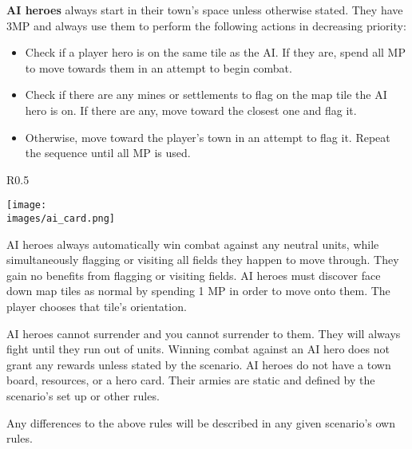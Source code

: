 \clearpage
\textbf{AI heroes} always start in their town's space unless otherwise stated.
They have 3MP and always use them to perform the following actions in decreasing priority:
\begin{itemize}
  \item Check if a player hero is on the same tile as the AI.
    If they are, spend all MP to move towards them in an attempt to begin combat.
  \item Check if there are any mines or settlements to flag on the map tile the AI hero is on.
    If there are any, move toward the closest one and flag it.
  \item Otherwise, move toward the player's town in an attempt to flag it.
Repeat the sequence until all MP is used.
\end{itemize}
\begin{wrapfigure}{R}{0.5\textwidth}
  \begin{center}
  \texttt{[image: \\images/ai\_card.png]}
  \end{center}
\end{wrapfigure}
AI heroes always automatically win combat against any neutral units, while simultaneously flagging or visiting all fields they happen to move through.
They gain no benefits from flagging or visiting fields.
AI heroes must discover face down map tiles as normal by spending 1 MP in order to move onto them.
The player chooses that tile’s orientation.\par
AI heroes cannot surrender and you cannot surrender to them.
They will always fight until they run out of units.
Winning combat against an AI hero does not grant any rewards unless stated by the scenario.
AI heroes do not have a town board, resources, or a hero card.
Their armies are static and defined by the scenario’s set up or other rules.\par
Any differences to the above rules will be described in any given scenario’s own rules.
